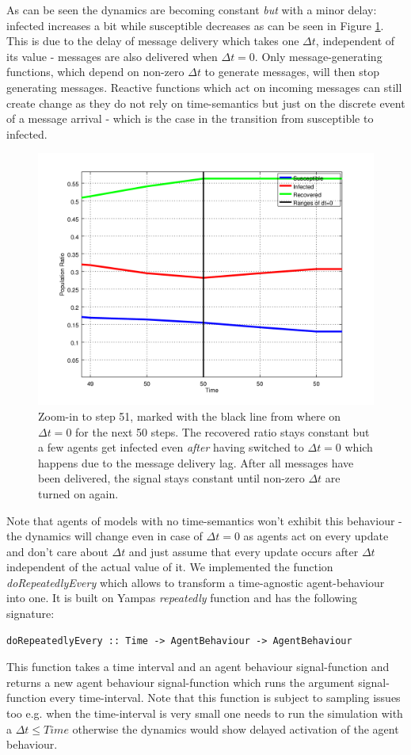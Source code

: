 As can be seen  the dynamics are becoming constant \textit{but} with a minor delay: infected increases a bit while susceptible decreases as can be seen in Figure \ref{fig:sir_abs_zero_dt_zoom}. This is due to the delay of message delivery which takes one $\Delta t$, independent of its value - messages are also delivered when $\Delta t = 0$. Only message-generating functions, which depend on non-zero $\Delta t$ to generate messages, will then stop generating messages. Reactive functions which act on incoming messages can still create change as they do not rely on time-semantics but just on the discrete event of a message arrival - which is the case in the transition from susceptible to infected.

\begin{figure}
	\centering
	\includegraphics[width=.4\textwidth, angle=0]{./../shared/fig/dtzero/SIR_ABS_zeroDt_mid_zoom.png}
	\caption{Zoom-in to step 51, marked with the black line from where on $\Delta t = 0$ for the next 50 steps. The recovered ratio stays constant but a few agents get infected even \textit{after} having switched to $\Delta t = 0$ which happens due to the message delivery lag. After all messages have been delivered, the signal stays constant until non-zero $\Delta t$ are turned on again.}
	\label{fig:sir_abs_zero_dt_zoom}
\end{figure}

Note that agents of models with no time-semantics won't exhibit this behaviour - the dynamics will change even in case of $\Delta t = 0$ as agents act on every update and don't care about $\Delta t$ and just assume that every update occurs after $\Delta t$ independent of the actual value of it. We implemented the function \textit{doRepeatedlyEvery} which allows to transform a time-agnostic agent-behaviour into one. It is built on Yampas \textit{repeatedly} function and has the following signature:

\begin{verbatim}
doRepeatedlyEvery :: Time -> AgentBehaviour -> AgentBehaviour
\end{verbatim}

This function takes a time interval and an agent behaviour signal-function and returns a new agent behaviour signal-function which runs the argument signal-function every time-interval. Note that this function is subject to sampling issues too e.g. when the time-interval is very small one needs to run the simulation with a $\Delta t \leq Time$ otherwise the dynamics would show delayed activation of the agent behaviour.